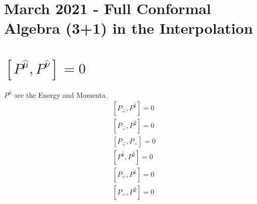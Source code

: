\documentclass[]{article}
\numberwithin{equation}{section}
\begin{document}
\section{March 2021 - Full \textbf{Conformal Algebra (3+1)} in the \textbf{Interpolation}}
\section{$\left[P^{\hat{\mu}},P^{\hat{\nu}}\right]=0$}
$P^{\hat{\mu}}$ are the Energy and Momenta.
\begin{align}
    &\left[P_{\hat{+}},P^{\hat{1}}\right]=0\\
    &\left[P_{\hat{+}},P^{\hat{2}}\right]=0\\
    &\left[P_{\hat{+}},P_{\hat{-}}\right]=0\\
    &\left[P^{\hat{1}},P^{\hat{2}}\right]=0\\
    & \left[P_{\hat{-}},P^{\hat{1}}\right]=0\\
    &\left[P_{\hat{-}},P^{\hat{2}}\right]=0
\end{align}
\end{document}

